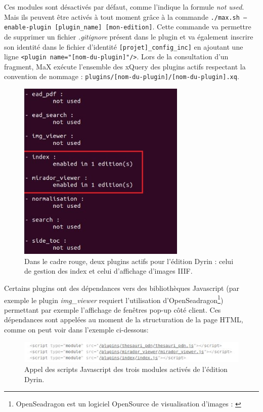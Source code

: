 \documentclass[a4paper,12pt,twoside]{book}
\begin{document}
Ces modules sont désactivés par défaut, comme l'indique la formule \textit{not used}. Mais ils peuvent être activés à tout moment grâce à la commande \texttt{./max.sh --enable-plugin [plugin\_name] [mon-edition]}. Cette commande va permettre de supprimer un fichier\textit{ .gitignore} présent dans le plugin et va également inscrire son identité dans le fichier d'identité \texttt{[projet]\_config\_inc]} en ajoutant une ligne \texttt{<plugin name="[nom-du-plugin]"/>}. Lors de la consultation d'un fragment, MaX exécute l'ensemble des xQuery des plugins actifs respectant la convention de nommage : \texttt{plugins/[nom-du-plugin]/[nom-du-plugin].xq}. 

\begin{figure}[H]
    \centering
    \includegraphics[width=8cm]{img/partie_2/plugins_actifs.JPG}
    \caption{Dans le cadre rouge, deux plugins actifs pour l'édition Dyrin : celui de gestion des index et celui d'affichage d'images \acrshort{IIIF}.}
\end{figure}

Certains plugins ont des dépendances vers des bibliothèques Javascript (par exemple le plugin \textit{img\_viewer} requiert l'utilisation d'OpenSeadragon\footnote{OpenSeadragon est un logiciel OpenSource de visualisation d'images : \cite{openseadragon}}) permettant par exemple l'affichage de fenêtres pop-up côté client. Ces dépendances sont appelées au moment de la structuration de la page \acrshort{HTML}, comme on peut voir dans l'exemple ci-dessous:

\begin{figure}[H]
    \centering
    \includegraphics[width=13cm]{img/partie_2/modules_html.JPG}
    \caption{Appel des scripts Javascript des trois modules activés de l'édition Dyrin.}
\end{figure}
\end{document}

